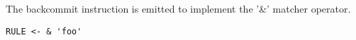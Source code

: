 The backcommit instruction is emitted to implement the
'\&' matcher operator.

\begin{myquote}
\begin{verbatim}
RULE <- & 'foo'
\end{verbatim}
\end{myquote}
